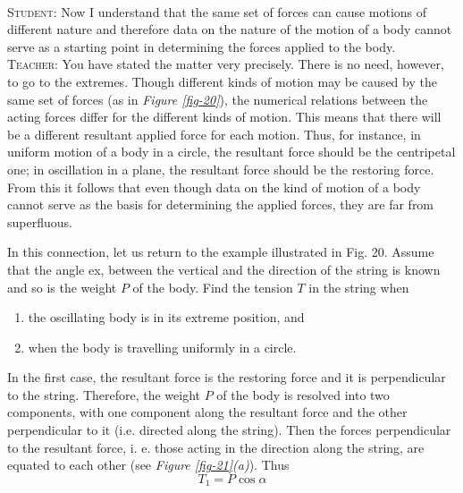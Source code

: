 \documentclass[a4paper,sfsidenotes]{tufte-book}
\begin{document}
\\
\textsc{Student:} Now I understand that the same set of forces can cause motions of different nature and therefore data on the nature of the motion of a body cannot serve as a starting point in determining the forces applied to the body.
\\
\textsc{Teacher:} You have stated the matter very precisely. There is no need, however, to go to the extremes. Though different kinds of motion may be caused by the same set of forces (as
in \emph{Figure \ref{fig-20}}), the numerical relations between the acting forces differ for the different kinds of motion. This means that there will be a different resultant applied force for each motion. Thus, for instance, in uniform motion of a body in a circle, the resultant force should be the centripetal one; in oscillation in a plane, the resultant force should be the restoring force. From this it follows that even though data on the kind of motion of a body cannot serve as the basis for determining the applied forces, they are far from superfluous.

In this connection, let us return to the example illustrated in Fig. 20. Assume that the angle ex, between the vertical and the direction of the string is known and so is the weight $P$ of the body. Find the tension $T$ in the string when 
\begin{enumerate}[label=\Roman*]
\item  the oscillating body is in its extreme position, and
\item when the body is travelling uniformly in a circle.
\end{enumerate}

In the first case, the resultant force is the restoring force and it is perpendicular to the string. Therefore, the weight $P$ of the body is resolved into two components, with one component along the
resultant force and the other perpendicular to it (i.e. directed along the string). Then the forces
perpendicular to the resultant force, i. e. those acting in the direction along the string, are equated to each other (see \emph{Figure \ref{fig-21}(a)}). Thus
$$
T_{1} = P \cos \alpha
$$
\end{document}
